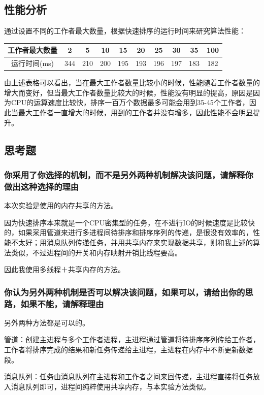 \documentclass[UTF8]{ctexart}
\begin{document}
\subsection{性能分析}
通过设置不同的工作者最大数量，根据快速排序的运行时间来研究算法性能：\par
\par
\begin{tabular}{|c|c|c|c|c|c|c|c|c|c|}
\par
\hline
工作者最大数量&2&5&10&15&20&25&30&35&100\\
\hline
运行时间(ms)&344&210&200&195&193&196&197&183&182\\
\hline
\end{tabular}
\qquad \par
由上述表格可以看出，当在最大工作者数量比较小的时候，性能随着工作者数量的增大而变好，但当最大工作者数量比较大的时候，性能没有明显的提高，原因是因为CPU的运算速度比较快，排序一百万个数据最多可能会用到35-45个工作者，因此当最大工作者一直增大的时候，用到的工作者并没有增多，因此性能不会明显提升。\par

\subsection{思考题}
\subsubsection{你采用了你选择的机制，而不是另外两种机制解决该问题，请解释你做出这种选择的理由}
本次实验是使用的内存共享的方法。\par
因为快速排序本来就是一个CPU密集型的任务，在不进行IO的时候速度是比较快的，如果采用管道来进行多进程间待排序和排序序列的传递，是很没有效率的，性能不太好；用消息队列传递任务，并用共享内存来实现数据共享，则和我上述的算法类似，不过进程间的开关和内存映射开销比线程要高。\par
因此我使用多线程＋共享内存的方法。\par

\subsubsection{你认为另外两种机制是否可以解决该问题，如果可以，请给出你的思路，如果不能，请解释理由}
另外两种方法都是可以的。\par
管道：创建主进程与多个工作者进程，主进程通过管道将待排序序列传给工作者，工作者将排序完成的结果和新任务传递给主进程，主进程在内存中不断更新数据段。\par
消息队列：任务由消息队列在主进程和工作者之间来回传递，主进程直接将任务放入消息队列即可，进程间纯粹使用共享内存，与本实验方法类似。\par
\end{document}
